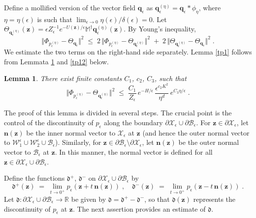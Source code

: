 \documentclass[reqno]{amsart}
\newtheorem{lemma}[theorem]{Lemma}
\newcounter{as}[section]
\newcommand{\mc}[1]{{\mathcal #1}}
\newcommand{\mf}[1]{{\mathfrak #1}}
\newcommand{\bb}[1]{{\mathbb #1}}
\newcommand{\bs}[1]{{\boldsymbol #1}}
\newcommand{\<}{\langle}
\renewcommand{\>}{\rangle}
\begin{document}
 Define a mollified version
of the vector field $\bs{q}_{\epsilon}$ as $\bs{q}_{\epsilon}^{(\eta)}
= \bs{q}_{\epsilon}*\phi_{\eta}$, where $\eta = \eta(\epsilon)$ is
such that $\lim_{\epsilon\to 0} \eta(\epsilon)/ \delta(\epsilon)
=0$. Let $\Theta_{\bs{q}_{\epsilon}^{(\eta)}} (\bs{z}) = \epsilon
Z_{\epsilon}^{-1} e^{-U(\bs{z})/\epsilon} \bb{M}^{\dagger}
\bs{q}_{\epsilon}^{(\eta)} (\bs{z})$. By Young's inequality,
\begin{equation*}
\big\Vert \Phi_{p_{\epsilon}^{(\eta)}} - \Theta_{\bs{q}_{\epsilon}}
\big\Vert ^{2} \;\le\;2 \, \big\Vert \Phi_{p_{\epsilon}^{(\eta)}} -
\Theta_{\bs{q}_{\epsilon}^{(\eta)}} \big\Vert ^{2}
\;+\; 2\, \big \Vert \Theta_{\bs{q}_{\epsilon}^{(\eta)}}
-\Theta_{\bs{q}_{\epsilon}}\big\Vert ^{2}\;.
\end{equation*}
We estimate the two terms on the right-hand side separately.  Lemma
\ref{tp1} follows from Lemmata \ref{tp11} and \ref{tp12} below.

\begin{lemma}
\label{tp11}
There exist finite constants $C_{1}$, $c_{2}$, $C_{3}$, such that
\begin{equation*}
\big\Vert \Phi_{p_{\epsilon}^{(\eta)}} -
\Theta_{\bs{q}_{\epsilon}^{(\eta)}}\big\Vert ^{2}
\;\le\; \frac{C_{1}}{Z_{\epsilon}}\,
e^{-H/\epsilon}\, \frac{\epsilon^{c_{2}K^{2}}}{\eta^{d}}
\, e^{C_{3}\eta/\epsilon}\;.
\end{equation*}
\end{lemma}

The proof of this lemma is divided in several steps.  The crucial
point is the control of the discontinuity of $p_{\epsilon}$ along the
boundary $\partial\mc{X}_{\epsilon}\cup\partial\mc{B}_{\epsilon}$.
For $\bs{z}\in\partial\mc{X}_{\epsilon}$, let $\bs{n}(\bs{z})$ be the
inner normal vector to $\mc{X}_{\epsilon}$ at $\bs{z}$ (and hence the
outer normal vector to $\mc{W}_{1}^{\epsilon} \cup
\mc{W}_{2}^{\epsilon} \cup \mc{B}_{\epsilon}$). Similarly, for
$\bs{z}\in\partial \mc{B}_{\epsilon} \setminus \partial
\mc{X}_{\epsilon}$, let $\bs{n}(\bs{z})$ be the outer normal vector to
$\mc{B}_{\epsilon}$ at $\bs{z}$. In this manner, the normal vector is
defined for all $\bs{z} \in \partial \mc{X}_{\epsilon} \cup \partial
\mc{B}_{\epsilon}$.

Define the functions $\mf{d}^{+}$, $\mf{d}^{-}$ on
$\partial\mc{X}_{\epsilon}\cup\partial\mc{B}_{\epsilon}$ by
\begin{equation*}
\mf{d}^{+}(\bs{z})\;=\; \lim_{t\rightarrow0^{+}}
p_{\epsilon}\left(\bs{z}+t\, \bs{n}(\bs{z})\right)\;,\quad
\mf{d}^{-}(\bs{z})\;=\;
\lim_{t\rightarrow0^{+}}p_{\epsilon} \left(\bs{z}-t\,
\bs{n}(\bs{z})\right)\;.
\end{equation*}
Let $\mf{d} : \partial\mc{X}_{\epsilon} \cup \partial\mc{B}_{\epsilon}
\to \bb R$ be given by $\mf{d} = \mf{d}^{+} - \mf{d}^{-}$, so that
$\mf{d}(\bs{z})$ represents the discontinuity of $p_{\epsilon}$ at
$\bs{z}$.  The next assertion provides an estimate of $\mf{d}$.
\end{document}
